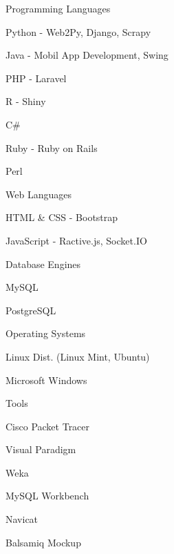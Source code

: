 \begin{cventries}
    \cventry
        {}
        {Programming Languages}
        {}
        {}
        {
            \begin{cvitems}
                \item {Python - Web2Py, Django, Scrapy}
                \item {Java - Mobil App Development, Swing}
                \item {PHP - Laravel}
                \item {R - Shiny}
                \item {C\#}
                \item {Ruby - Ruby on Rails}
                \item {Perl}
            \end{cvitems}
        }
    \cventry
        {}
        {Web Languages}
        {}
        {}
        {
            \begin{cvitems}
                \item{HTML \& CSS - Bootstrap }
                \item{JavaScript - Ractive.js, Socket.IO}
            \end{cvitems}
        }
    \cventry
        {}
        {Database Engines}
        {}
        {}
        {
            \begin{cvitems}
                \item{MySQL}
                \item{PostgreSQL}
            \end{cvitems}
        }
    \cventry
        {}
        {Operating Systems}
        {}
        {}
        {
            \begin{cvitems}
                \item{Linux Dist. (Linux Mint, Ubuntu)}
                \item{Microsoft Windows}
            \end{cvitems}
        }
    \cventry
        {}
        {Tools}
        {}
        {}
        {
            \begin{cvitems}
                \item{Cisco Packet Tracer}
                \item{Visual Paradigm}
                \item{Weka}
                \item{MySQL Workbench}
                \item{Navicat}
                \item{Balsamiq Mockup}

\end{cvitems}}
\end{cventries}
